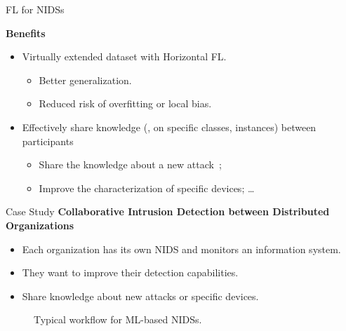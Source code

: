

\begin{frame}{FL for NIDSs}

  \textbf{Benefits}
  \begin{itemize}[<+->]
    \item Virtually extended dataset with Horizontal FL.
    \begin{itemize}[<1->]
      \item Better generalization.
      \item Reduced risk of overfitting or local bias.
    \end{itemize}
    

    \item Effectively share knowledge (\eg, on specific classes, instances) between participants
    \begin{itemize}[<1->]
      \item Share the knowledge about a new attack~\autocite{lavaur_icdcs_demo_2024};
      \item Improve the characterization of specific devices; \dots
    \end{itemize}


  \end{itemize}
\end{frame}


\begin{frame}{Case Study}
  \bigskip
  \textbf{Collaborative Intrusion Detection between Distributed Organizations}
  \begin{itemize}
    \item Each organization has its own NIDS and monitors an information system.
    \item They want to improve their detection capabilities.
    \item Share knowledge about new attacks or specific devices.
  \end{itemize}
  \bigskip
  \pause
  \begin{figure}
    \centering
    \caption{Typical workflow for ML-based NIDSs.}
  \end{figure}
\end{frame}


